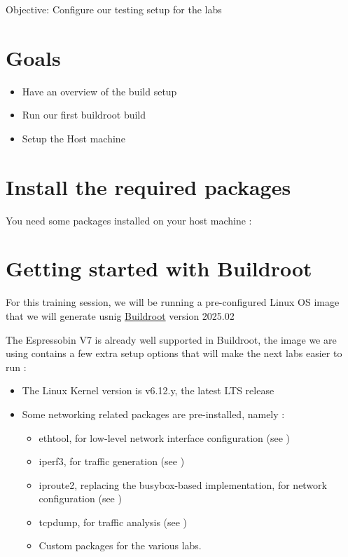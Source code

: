 {Objective: Configure our testing setup for the labs}

\section{Goals}

\begin{itemize}
\item Have an overview of the build setup
\item Run our first buildroot build
\item Setup the Host machine
\end{itemize}

\section{Install the required packages}

You need some packages installed on your host machine :


\section{Getting started with Buildroot}

For this training session, we will be running a pre-configured Linux OS image that
we will generate usnig \href{https://buildroot.org/}{Buildroot} version 2025.02

The Espressobin V7 is already well supported in Buildroot, the image we are using
contains a few extra setup options that will make the next labs easier to run :

\begin{itemize}
	\item The Linux Kernel version is v6.12.y, the latest LTS release
	\item Some networking related packages are pre-installed, namely :
		\begin{itemize}
			\item ethtool, for low-level network interface configuration (see )
			\item iperf3, for traffic generation (see \manpage{iperf3}{1})
			\item iproute2, replacing the busybox-based implementation, for network configuration (see )
			\item tcpdump, for traffic analysis (see \manpage{tcpdump}{8})
			\item Custom packages for the various labs.
		\end{itemize}
\end{itemize}

